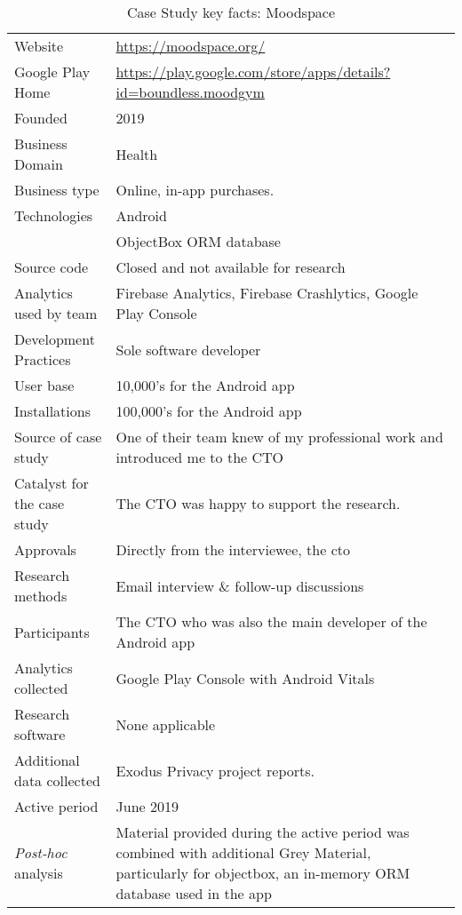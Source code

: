 {\renewcommand{\arraystretch}{0.8}%
\begin{table*}
    \centering
    \small
    \setlength{\tabcolsep}{6pt}
    \begin{tabular}{lp{9cm}}
       \toprule
       Website &\url{https://moodspace.org/} \\
       Google Play Home & \url{https://play.google.com/store/apps/details?id=boundless.moodgym} \\
       Founded & 2019 \\
       Business Domain & Health \\
       Business type & Online, in-app purchases. \\
       Technologies  & Android \\
       & ObjectBox ORM database \\
       Source code  &Closed and not available for research \\
       Analytics used by team & Firebase Analytics, Firebase Crashlytics, Google Play Console \\
       Development Practices & Sole software developer \\
       \arrayrulecolor{blue!20}\midrule
       User base & 10,000's for the Android app \\
       Installations & 100,000's for the Android app \\
       \arrayrulecolor{blue!20}\midrule
       Source of case study &One of their team knew of my professional work and introduced me to the CTO \\
       Catalyst for the case study &The CTO was happy to support the research. \\
       Approvals &Directly from the interviewee, the \Gls{cto} \\
       \arrayrulecolor{blue!20}\midrule
       Research methods &Email interview \& follow-up discussions \\
       Participants &The CTO who was also the main developer of the Android app \\
       Analytics collected &Google Play Console with Android Vitals \\
       Research software & None applicable \\
       Additional data collected &Exodus Privacy project reports. \\
       Active period & June 2019 \\
       \arrayrulecolor{blue!20}\midrule
       \emph{Post-hoc} analysis &Material provided during the active period was combined with additional Grey Material, particularly for objectbox, an in-memory ORM database used in the app \\
       \bottomrule
    \end{tabular}
    \caption{Case Study key facts: Moodspace}
    \label{tab:moodspace_case_study_anaytics_overview}
\end{table*}
}

